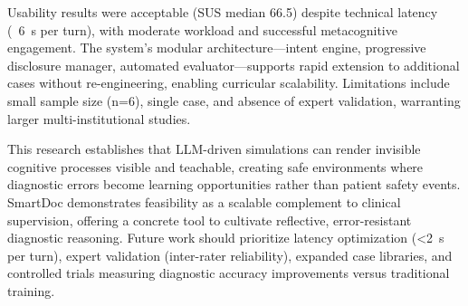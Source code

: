 Usability results were acceptable (SUS median 66.5) despite technical latency (~6~s per turn), with moderate
workload and successful metacognitive engagement. The system's modular architecture—intent engine, progressive
disclosure manager, automated evaluator—supports rapid extension to additional cases without re-engineering,
enabling curricular scalability. Limitations include small sample size (n=6), single case, and absence of expert
validation, warranting larger multi-institutional studies.

This research establishes that LLM-driven simulations can render invisible cognitive processes visible and
teachable, creating safe environments where diagnostic errors become learning opportunities rather than patient
safety events. SmartDoc demonstrates feasibility as a scalable complement to clinical supervision, offering a
concrete tool to cultivate reflective, error-resistant diagnostic reasoning. Future work should prioritize latency
optimization (<2~s per turn), expert validation (inter-rater reliability), expanded case libraries, and controlled
trials measuring diagnostic accuracy improvements versus traditional training.


\newpage